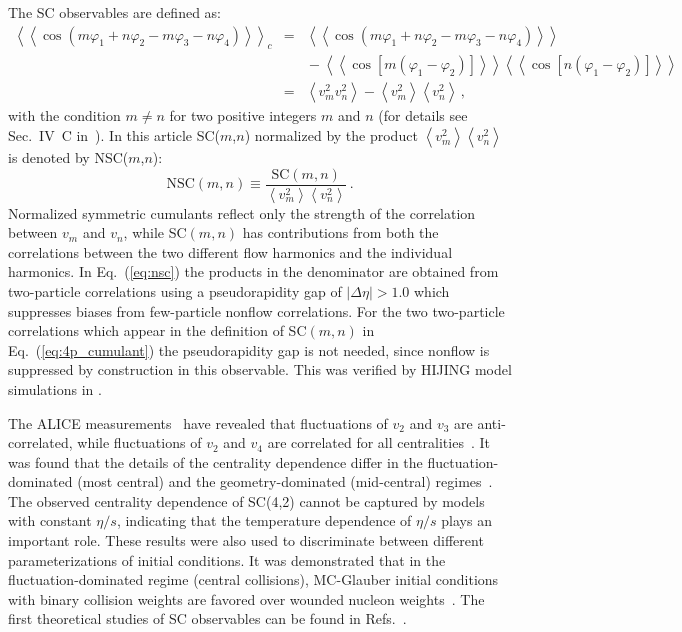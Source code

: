 The SC observables are defined as:
\begin{eqnarray}
\left<\left<\cos(m\varphi_1\!+\!n\varphi_2\!-\!m\varphi_3-\!n\varphi_4)\right>\right>_c &=& \left<\left<\cos(m\varphi_1\!+\!n\varphi_2\!-\!m\varphi_3-\!n\varphi_4)\right>\right>\nonumber\\
&&{}-\left<\left<\cos[m(\varphi_1\!-\!\varphi_2)]\right>\right>\left<\left<\cos[n(\varphi_1\!-\!\varphi_2)]\right>\right>\nonumber\\
&=&\left<v_{m}^2v_{n}^2\right>-\left<v_{m}^2\right>\left<v_{n}^2\right>\,,%
\label{eq:4p_cumulant}
\end{eqnarray}
%
with the condition $m\neq n$ for two positive integers $m$ and $n$ (for details see Sec.~IV~C in~\cite{Bilandzic:2013kga}).
In this article SC($m$,$n$) normalized by the product $\left<v_{m}^2\right>\left<v_{n}^2\right>$~\cite{ALICE:2016kpq,Giacalone:2016afq} is denoted by NSC($m$,$n$):
%
\begin{equation}
\mathrm{NSC}(m,n) \equiv \frac{\mathrm{SC}(m,n)}{\left<v_{m}^2\right>\left<v_{n}^2\right>}\,.
\label{eq:nsc}
\end{equation}
%
Normalized symmetric cumulants reflect only the strength of the correlation between $v_{m}$ and $v_{n}$, while SC$(m,n)$ has contributions from both the correlations between the two different flow harmonics and the individual harmonics. In Eq.~(\ref{eq:nsc}) the products in the denominator are obtained from two-particle correlations using a pseudorapidity gap of $|\Delta\eta| > 1.0$ which suppresses biases from few-particle nonflow correlations. For the two two-particle correlations which appear in the definition of SC$(m,n)$ in Eq.~(\ref{eq:4p_cumulant}) the pseudorapidity gap is not needed, since nonflow is suppressed by construction in this observable. This was verified by HIJING model simulations in \cite{ALICE:2016kpq}.

The ALICE measurements~\cite{ALICE:2016kpq} have revealed that fluctuations of $v_2$ and $v_3$ are anti-correlated, while fluctuations of $v_2$ and $v_4$ are correlated for all centralities~\cite{ALICE:2016kpq}. It was found that the details of the centrality dependence differ in the fluctuation-dominated (most central) and the geometry-dominated (mid-central) regimes~\cite{ALICE:2016kpq}. The observed centrality dependence of SC(4,2) cannot be captured by models with constant $\eta/s$, indicating that the temperature dependence of $\eta/s$ plays an important role. These results were also used to discriminate between different parameterizations of initial conditions. It was demonstrated that in the fluctuation-dominated regime (central collisions), MC-Glauber initial conditions with binary collision weights are favored over wounded nucleon weights~\cite{ALICE:2016kpq}. 
The first theoretical studies of SC observables can be found in Refs.~\cite{Giacalone:2016afq,Qian:2016pau,Gardim:2016nrr,Zhu:2016puf,Ke:2016jrd}.

